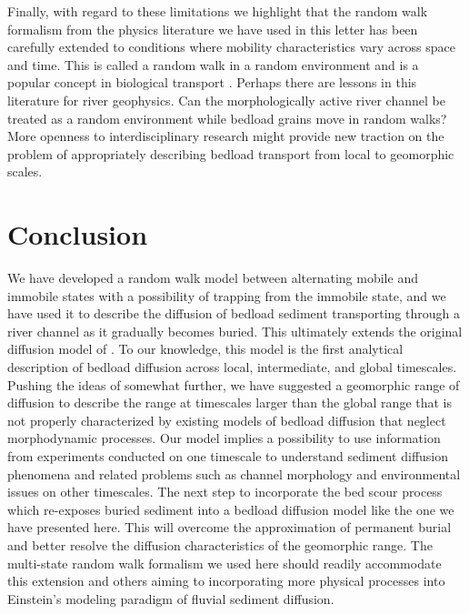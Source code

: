 \documentclass[]{agujournal2018}
\begin{document}
Finally, with regard to these limitations we highlight that the random walk formalism from the physics literature we have used in this letter \citep{Weiss1994} has been carefully extended to conditions where mobility characteristics vary across space and time. This is called a random walk in a random environment and is a popular concept in biological transport \citep[e.g.][]{Codling2008}. Perhaps there are lessons in this literature for river geophysics. Can the morphologically active river channel be treated as a random environment while bedload grains move in random walks?
More openness to interdisciplinary research might provide new traction on the problem of appropriately describing bedload transport from local to geomorphic scales.

\section{Conclusion}
\label{sec:conclusion}
We have developed a random walk model between alternating mobile and immobile states with a possibility of trapping from the immobile state, and we have used it to describe the diffusion of bedload sediment transporting through a river channel as it gradually becomes buried.
This ultimately extends the original diffusion model of \citet{Einstein1937}.
To our knowledge, this model is the first analytical description of bedload diffusion across local, intermediate, and global timescales.
Pushing the ideas of \citet{Nikora2002} somewhat further, we have suggested a geomorphic range of diffusion to describe the range at timescales larger than the global range that is not properly characterized by existing models of bedload diffusion that neglect morphodynamic processes.
Our model implies a possibility to use information from experiments conducted on one timescale to understand sediment diffusion phenomena and related problems such as channel morphology \citep[e.g.][]{Church2006, Hassan2017} and environmental issues \citep[e.g.][]{Macklin2006,Gaeuman2017} on other timescales.
The next step to incorporate the bed scour process which re-exposes buried sediment into a bedload diffusion model like the one we have presented here.
This will overcome the approximation of permanent burial and better resolve the diffusion characteristics of the geomorphic range. 
The multi-state random walk formalism we used here should readily accommodate this extension \citep[e.g.][]{Weiss1994} and others aiming to incorporating more physical processes into Einstein's modeling paradigm of fluvial sediment diffusion.
\end{document}
